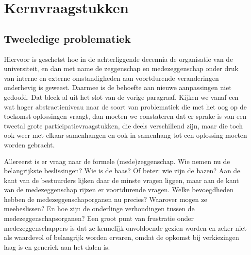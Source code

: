 \documentclass[smallauthor, chapterhaspagenum, nochapterinheader, pagenuminheader,  bigchapnum,medium2, tocpages, garamond, titleinheader]{jote-book}
\begin{document}
	\section{Kernvraagstukken}



	\subsection{Tweeledige problematiek}



	Hiervoor is geschetst hoe in de achterliggende decennia de organisatie van de universiteit, en dan met name de zeggenschap en medezeggenschap onder druk van interne en externe omstandigheden aan voortdurende veranderingen onderhevig is geweest. Daarmee is de behoefte aan nieuwe aanpassingen niet gedoofd. Dat bleek al uit het slot van de vorige paragraaf. Kijken we vanaf een wat hoger abstractieniveau naar de soort van problematiek die met het oog op de toekomst oplossingen vraagt, dan moeten we constateren dat er sprake is van een tweetal grote participatievraagstukken, die deels verschillend zijn, maar die toch ook weer met elkaar samenhangen en ook in samenhang tot een oplossing moeten worden gebracht.



	Allereerst is er vraag naar de formele (mede)zeggenschap. Wie nemen nu de belangrijkste beslissingen? Wie is de baas? Of beter: wie zijn de bazen? Aan de kant van de bestuurders lijken daar de minste vragen liggen, maar aan de kant van de medezeggenschap rijzen er voortdurende vragen. Welke bevoegdheden hebben de medezeggenschaporganen nu precies? Waarover mogen ze meebeslissen? En hoe zijn de onderlinge verhoudingen tussen de medezeggenschapsorganen? Een groot punt van frustratie onder medezeggenschappers is dat ze kennelijk onvoldoende gezien worden en zeker niet als waardevol of belangrijk worden ervaren, omdat de opkomst bij verkiezingen laag is en generiek aan het dalen is.
\end{document}

